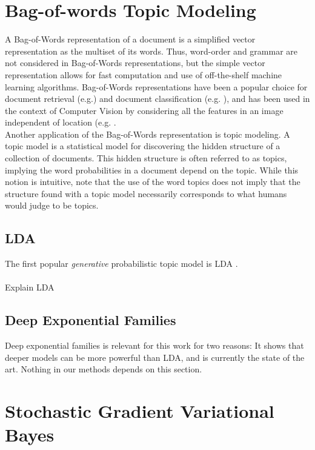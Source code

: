 \documentclass{report}
\begin{document}
\section{Bag-of-words Topic Modeling}
A Bag-of-Words representation of a document is a simplified vector representation as the multiset of its words. Thus, word-order and grammar are not considered in Bag-of-Words representations, but the simple vector representation allows for fast computation and use of off-the-shelf machine learning algorithms. Bag-of-Words representations have been a popular choice for document retrieval (e.g.\cite{landauer1990fully}) and document classification (e.g. \cite{li1998classification}), and has been used in the context of Computer Vision by considering all the features in an image independent of location (e.g. \cite{fei2005bayesian}. \\
Another application of the Bag-of-Words representation is topic modeling. A topic model is a statistical model for discovering the hidden structure of a collection of documents. This hidden structure is often referred to as topics, implying the word probabilities in a document depend on the topic. While this notion is intuitive, note that the use of the word topics does not imply that the structure found with a topic model necessarily corresponds to what humans would judge to be topics.

\subsection{LDA}\label{LDA}
The first popular \textit{generative} probabilistic topic model is LDA \cite{blei2003latent}. \\ \\
Explain LDA 
\subsection{Deep Exponential Families}\label{DEF}

Deep exponential families is relevant for this work for two reasons: It shows that deeper models can be more powerful than LDA, and is currently the state of the art. Nothing in our methods depends on this section.


\section{Stochastic Gradient Variational Bayes}\label{sgvb_section}
\end{document}
